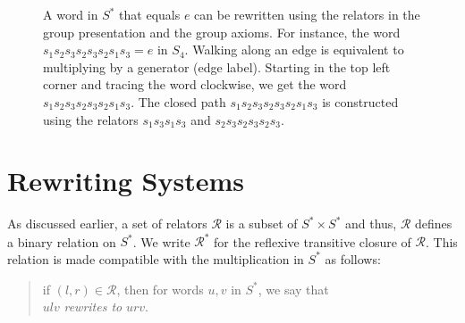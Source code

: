 \documentclass[12pt,a4paper]{amsart}
\newcommand{\id}{e}
\newcommand{\rws}{\mathcal{R}}
\numberwithin{equation}{section}
\begin{document}
\begin{figure}[ht]
\begin{center}
  \caption[Loops on a Cayley Graph]{A word in $S^*$ that equals $\id$ can be rewritten using the relators in the group presentation and the group axioms. For instance, the word $s_1s_2s_3s_2s_3s_2s_1s_3 = \id $ in $S_4$.
  Walking along an edge is equivalent to multiplying by a generator (edge label). Starting in the top left corner and tracing the word clockwise, we get the word $s_1s_2s_3s_2s_3s_2s_1s_3$. The closed path  $s_1s_2s_3s_2s_3s_2s_1s_3$ is constructed using the relators $s_1s_3s_1s_3$ and $s_2s_3s_2s_3s_2s_3$.}
  \label{fig:cayleyg}
  \end{center}
  \end{figure}
\section{Rewriting Systems}\label{sec:rws}
As discussed earlier, a set of relators $\mathcal{R}$ is a subset of $S^* \times S^*$ and thus, $\mathcal{R}$ defines a binary relation on $S^*$.  We write $\rws^*$ for the reflexive transitive closure of $\rws$. 
%
This relation is made compatible with the multiplication in $S^*$ as follows: 
\begin{quote}
if $(l, r) \in \mathcal{R}$, then for words $u,v$ in $S^*$, we say that\\ 
$ulv$ \emph{rewrites to} $urv$.
\end{quote}
\end{document}
